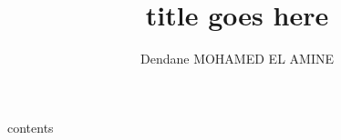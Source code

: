 \documentclass[12pt,a4paper]{article}
\title{title goes here}
\author{Dendane MOHAMED EL AMINE}
\date{}
\begin{document}
\maketitle
\newpage
\tableof contents
\newpage
\section{}

\newpage


\end{document}
